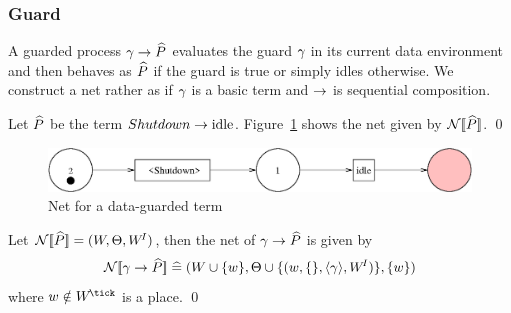 \subsubsection{Guard}
A guarded process $\gamma \rightarrow {\widehat{P}}$ evaluates the guard $\gamma$ in its
current data environment and then behaves as ${\widehat{P}}$ if the guard is true or
simply idles otherwise. We construct a net rather as if $\gamma$ is a basic
term and $\rightarrow$ is sequential composition.
\begin{exampleb}
Let ${\widehat{P}}$ be the term $Shutdown \rightarrow \mathrm{idle}$. Figure~\ref{fig:guardnet}
shows the net given by ${\mathcal{N}[\![{\widehat{P}}]\!]}$.
\qed
\end{exampleb}
\begin{figure}[h]
\begin{center}
\includegraphics[width=.8\linewidth]{TGGEN/guard.eps}
\end{center}
\caption{Net for a data-guarded term\label{fig:guardnet}}
\end{figure}
\begin{definition}
Let ${\mathcal{N}[\![{\widehat{P}}]\!]} = (W,\Theta,W^{\!I})$, then the net of $\gamma \rightarrow {\widehat{P}}$ is
given by
\[{\mathcal{N}[\![\gamma \rightarrow {\widehat{P}}]\!]} \mathrel{\widehat=} (W \cup \{{w}\},\Theta \cup
\{({w},\{\},{\langle \gamma\rangle},W^{\!I})\},\{{w}\}) \]
where $\ww \notin \WTick$ is a place.
\qed
\end{definition}
  
